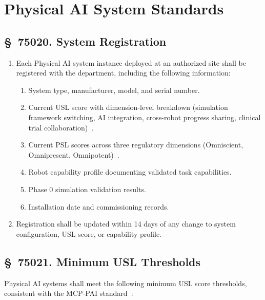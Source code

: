 \section{Physical AI System Standards}

\subsection{\S~75020. System Registration}

\begin{enumerate}[label=(\alph*)]
\item Each Physical AI system instance deployed at an authorized site shall be
  registered with the department, including the following information:
  \begin{enumerate}[label=(\arabic*)]
  \item System type, manufacturer, model, and serial number.
  \item Current USL score with dimension-level breakdown (simulation framework
    switching, AI integration, cross-robot progress sharing, clinical trial
    collaboration)~\cite{usl2026}.
  \item Current PSL scores across three regulatory dimensions (Omniscient,
    Omnipresent, Omnipotent)~\cite{pslframework2026}.
  \item Robot capability profile documenting validated task capabilities.
  \item Phase 0 simulation validation results.
  \item Installation date and commissioning records.
  \end{enumerate}

\item Registration shall be updated within 14 days of any change to system
  configuration, USL score, or capability profile.
\end{enumerate}

\subsection{\S~75021. Minimum USL Thresholds}

Physical AI systems shall meet the following minimum USL score thresholds,
consistent with the MCP-PAI standard~\cite{cfr50adapt}:


